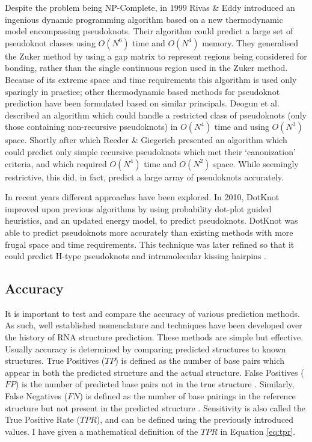 \documentclass{cshonours}
\begin{document}
Despite the problem being NP-Complete, in 1999 Rivas \& Eddy \cite{rivas1999dynamic} introduced an ingenious dynamic
programming algorithm based on a new thermodynamic model encompassing pseudoknots. Their algorithm could predict a large set of pseudoknot classes using
$O(N^6)$ time and $O(N^4)$ memory. They generalised the Zuker method by using a gap matrix to represent regions being considered for bonding, rather than
the single continuous region used in the Zuker method. Because of its extreme
space and time requirements this algorithm is used only sparingly in practice; other thermodynamic based methods for pseudoknot prediction have
been formulated based on similar principals. Deogun et al. \cite{deogun2004rna} described an algorithm which could handle a restricted class of pseudoknots (only those containing
non-recursive pseudoknots) in $O(N^4)$ time and using $O(N^3)$ space. Shortly after which Reeder \& Giegerich \cite{reeder2004design} presented an algorithm which could predict
only simple recursive pseudoknots which met their `canonization' criteria, and which required $O(N^4)$ time and $O(N^2)$ space. While
seemingly restrictive, this did, in fact, predict a large array of pseudoknots accurately. 

In recent years different approaches have been explored. In 2010, DotKnot \cite{sperschneider2010dotknot} improved upon previous algorithms by using probability dot-plot guided heuristics, and an updated energy model, to predict pseudoknots. DotKnot was able to predict pseudoknots more accurately than existing methods with more frugal space and time requirements. This technique was later refined so that it could predict H-type pseudoknots and intramolecular kissing hairpins \cite{sperschneider2011heuristic}.


\subsection{Accuracy}
It is important to test and compare the accuracy of various prediction methods.
As such, well established nomenclature and techniques have been developed over
the history of RNA structure prediction. These methods are simple but effective. Usually accuracy is determined by comparing predicted structures to known
structures. True Positives ($TP$) is defined as the number of base pairs which appear in both the predicted structure and the actual structure. False Positives
($FP$) is the number of predicted base pairs not in the true
structure \cite{lorenz2011viennarna}. Similarly, False Negatives ($FN$) is defined as the number of base
pairings in the reference structure but not present in the predicted structure \cite{lorenz2011viennarna}.
Sensitivity is also called the True Positive Rate ($TPR$), and can be defined using the previously introduced values. I have given a mathematical definition of the $TPR$ in Equation \ref{eq:tpr}.
\end{document}
